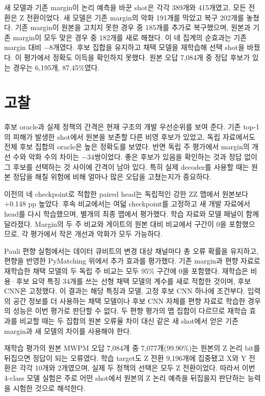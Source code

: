 \documentclass[aps,prd,12pt,twocolumn,superscriptaddress,floatfix]{revtex4-2}
\begin{document}
새 모델과 기존 margin이 논리 예측을 바꾼 shot은 각각 389개와 415개였고, 모든 전환은 Z 전환이었다. 새 모델은 기존 margin의 악화 191개를 막았고 복구 202개를 놓쳤다. 기존 margin이 원본을 고치지 못한 경우 중 185개를 추가로 복구했으며, 원본과 기존 margin이 모두 맞은 경우 중 182개를 새로 해쳤다. 이 네 집계의 순효과는 기존 margin 대비 \ensuremath{-}8개였다. 후보 집합을 유지하고 채택 모델을 재학습해 선택 shot을 바꿨다. 이 평가에서 정확도 이득을 확인하지 못했다. 원본 오답 7,084개 중 정답 후보가 있는 경우는 6,195개, 87.45\%였다.

\section{고찰}

후보 oracle과 실제 정책의 간격은 현재 구조의 개발 우선순위를 보여 준다. 기존 top-1의 피해가 발생한 shot에서 원본을 보존할 다른 비영 후보가 있었고, 독립 자료에서도 전체 후보 집합의 oracle은 높은 정확도를 보였다. 반면 독립 주 평가에서 margin의 개선 수와 악화 수의 차이는 \ensuremath{-}34쌍이었다. 좋은 후보가 있음을 확인하는 것과 정답 없이 그 후보를 선택하는 것 사이에 간격이 남아 있다. 특히 실제 decoder를 사용할 때는 원본 정답을 해칠 위험에 비해 얼마나 많은 오답을 고쳤는지가 중요하다.

이전의 네 checkpoint로 적합한 paired head는 독립적인 강한 ZZ 맵에서 원본보다 +0.148 pp 높았다. 후속 비교에서는 여덟 checkpoint를 고정하고 새 개발 자료에서 head를 다시 학습했으며, 별개의 최종 맵에서 평가했다. 학습 자료와 모델 패널이 함께 달라졌다. Margin의 두 주 비교와 게이트의 원본 대비 비교에서 구간이 0을 포함했으므로, 각 평가에서 작은 개선과 악화가 모두 가능하다.

Pauli 편향 실험에서는 데이터 큐비트의 변경 대상 채널마다 총 오류 확률을 유지하고, 편향을 반영한 PyMatching 위에서 추가 효과를 평가했다. 기존 margin과 편향 자료로 재학습한 채택 모델의 두 독립 주 비교는 모두 95\% 구간에 0을 포함했다. 재학습은 비용·후보 요약 특징 34개를 쓰는 선형 채택 모델의 계수를 새로 적합한 것이며, 후보 CNN은 고정했다. 이 결과는 해당 특징과 모델, 고정 후보 CNN 하나에 조건부다. 입력의 공간 정보를 더 사용하는 채택 모델이나 후보 CNN 자체를 편향 자료로 학습한 경우의 성능은 이번 평가로 판단할 수 없다. 두 편향 평가의 맵 집합이 다르므로 재학습 효과를 비교할 때는 두 집합의 원본 오류율 차이 대신 같은 새 shot에서 얻은 기존 margin과 새 모델의 차이를 사용해야 한다.

재학습 평가의 원본 MWPM 오답 7,084개 중 7,077개(99.90\%)는 원본의 Z 논리 bit를 뒤집으면 정답이 되는 오류였다. 학습 target도 Z 전환 9,196개에 집중됐고 X와 Y 전환은 각각 10개와 2개였으며, 실제 두 정책의 선택은 모두 Z 전환이었다. 따라서 이번 4-class 모델 실험은 주로 어떤 shot에서 원본의 Z 논리 예측을 뒤집을지 판단하는 능력을 시험한 것으로 해석한다.
\end{document}
